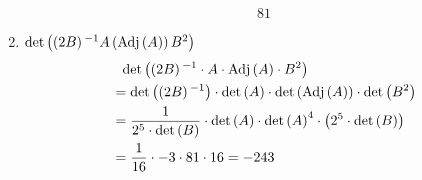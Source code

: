 \begin{enumerate}[label=\listAlph]
\[                81
            \]
        \item \(\det\left(\left(2B\right){}^{-1} A\left(\text{Adj}\left(A\right)\right)B^2\right)\)
            \[
                \begin{aligned}
                    &\phantom{=} \text{det} \left( \left(2B\right){}^{-1} \cdot A \cdot \text{Adj} \left( A \right) \cdot B^2 \right) \\
                    &= \text{det} \left( \left(2B\right){}^{-1} \right) \cdot \text{det} \left( A \right) \cdot \text{det} \left( \text{Adj} \left( A \right) \right) \cdot \text{det} \left( B^2 \right) \\
                    &= \frac{1}{2^5 \cdot \text{det} \left( B \right)} \cdot \text{det} \left( A \right) \cdot \text{det} \left( A \right)^{4} \cdot \left(2^5 \cdot \text{det} \left( B \right)\right) \\
                    &= \frac{1}{16} \cdot -3 \cdot 81 \cdot 16 
                    = -243
                \end{aligned}
            \]
    \end{enumerate}
